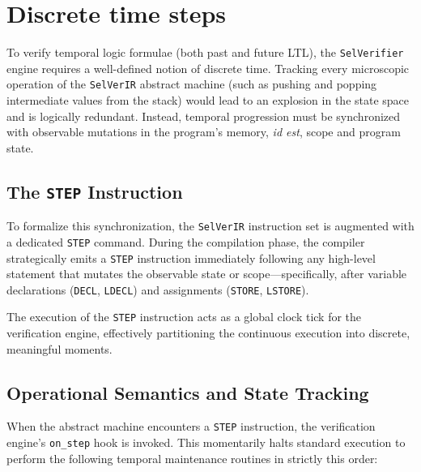 \documentclass{article}
\begin{document}
\newpage
\section{Discrete time steps}

To verify temporal logic formulae (both past and future LTL), the \texttt{SelVerifier} engine requires a well-defined notion of discrete time. Tracking every microscopic operation of the \texttt{SelVerIR} abstract machine (such as pushing and popping intermediate values from the stack) would lead to an explosion in the state space and is logically redundant. Instead, temporal progression must be synchronized with observable mutations in the program's memory, \textit{id est}, scope and program state.

\subsection{The \texttt{STEP} Instruction}
To formalize this synchronization, the \texttt{SelVerIR} instruction set is augmented with a dedicated \texttt{STEP} command. During the compilation phase, the compiler strategically emits a \texttt{STEP} instruction immediately following any high-level statement that mutates the observable state or scope---specifically, after variable declarations (\texttt{DECL}, \texttt{LDECL}) and assignments (\texttt{STORE}, \texttt{LSTORE}).

The execution of the \texttt{STEP} instruction acts as a global clock tick for the verification engine, effectively partitioning the continuous execution into discrete, meaningful moments.

\subsection{Operational Semantics and State Tracking}
When the abstract machine encounters a \texttt{STEP} instruction, the verification engine's \texttt{on\_step} hook is invoked. This momentarily halts standard execution to perform the following temporal maintenance routines in strictly this order:
\end{document}
